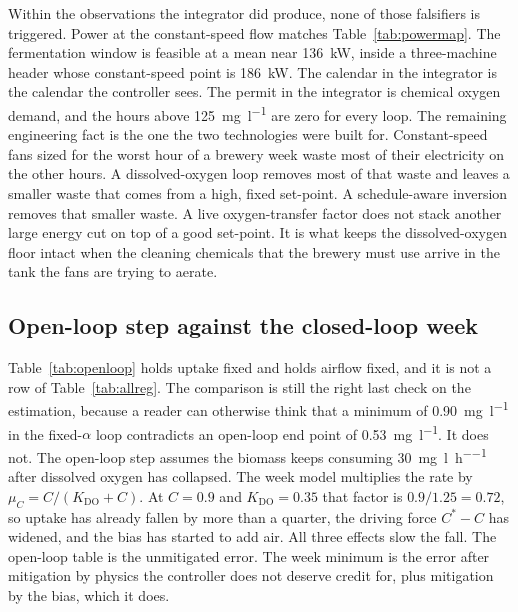 Within the observations the integrator did produce, none of those falsifiers is triggered. Power at the constant-speed flow matches Table~\ref{tab:powermap}. The fermentation window is feasible at a mean near \SI{136}{\kilo\watt}, inside a three-machine header whose constant-speed point is \SI{186}{\kilo\watt}. The calendar in the integrator is the calendar the controller sees. The permit in the integrator is chemical oxygen demand, and the hours above \SI{125}{\milli\gram\per\litre} are zero for every loop. The remaining engineering fact is the one the two technologies were built for. Constant-speed fans sized for the worst hour of a brewery week waste most of their electricity on the other hours. A dissolved-oxygen loop removes most of that waste and leaves a smaller waste that comes from a high, fixed set-point. A schedule-aware inversion removes that smaller waste. A live oxygen-transfer factor does not stack another large energy cut on top of a good set-point. It is what keeps the dissolved-oxygen floor intact when the cleaning chemicals that the brewery must use arrive in the tank the fans are trying to aerate.

\subsection{Open-loop step against the closed-loop week}

Table~\ref{tab:openloop} holds uptake fixed and holds airflow fixed, and it is not a row of Table~\ref{tab:allreg}. The comparison is still the right last check on the estimation, because a reader can otherwise think that a minimum of \SI{0.90}{\milli\gram\per\litre} in the fixed-$\alpha$ loop contradicts an open-loop end point of \SI{0.53}{\milli\gram\per\litre}. It does not. The open-loop step assumes the biomass keeps consuming \SI{30}{\milli\gram\per\litre\per\hour} after dissolved oxygen has collapsed. The week model multiplies the rate by $\mu_{C}=C/(K_{\mathrm{DO}}+C)$. At $C=0.9$ and $K_{\mathrm{DO}}=0.35$ that factor is $0.9/1.25=0.72$, so uptake has already fallen by more than a quarter, the driving force $C^{*}-C$ has widened, and the bias has started to add air. All three effects slow the fall. The open-loop table is the unmitigated error. The week minimum is the error after mitigation by physics the controller does not deserve credit for, plus mitigation by the bias, which it does.

